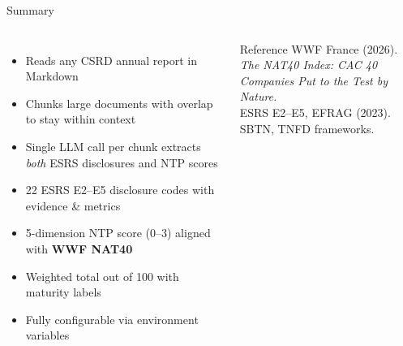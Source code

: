 \documentclass[aspectratio=169]{beamer}
\begin{document}
\begin{frame}{Summary}
  \begin{columns}
      \begin{itemize}
        \setlength\itemsep{6pt}
        \item[\checkmark] Reads any CSRD annual report in Markdown
        \item[\checkmark] Chunks large documents with overlap to stay within context
        \item[\checkmark] Single LLM call per chunk extracts \emph{both} ESRS disclosures
              and NTP scores
        \item[\checkmark] 22 ESRS E2--E5 disclosure codes with evidence \& metrics
        \item[\checkmark] 5-dimension NTP score (0--3) aligned with \textbf{WWF NAT40}
        \item[\checkmark] Weighted total out of 100 with maturity labels
        \item[\checkmark] Fully configurable via environment variables
      \end{itemize}
      \begin{block}{Reference}
        WWF France (2026).\\
        \textit{The NAT40 Index: CAC 40 Companies Put to the Test by Nature.}\\[6pt]
        ESRS E2--E5, EFRAG (2023).\\[6pt]
        SBTN, TNFD frameworks.
      \end{block}
  \end{columns}
\end{frame}
\end{document}
